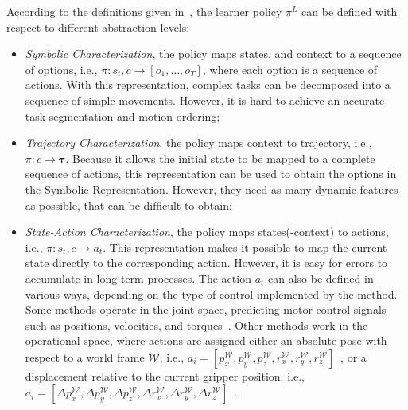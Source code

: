 According to the definitions given in~\cite{osa2018algorithmic,fang2019survey}, the learner policy $\pi^{L}$ can be defined with respect to different abstraction levels:
\begin{itemize}
    \item \textit{Symbolic Characterization}, the policy maps states, and context to a sequence of options, i.e., $\pi: s_{t}, c \rightarrow [o_1, \dots, o_T]$, where each option is a sequence of actions. With this representation, complex tasks can be decomposed into a sequence of simple movements. However, it is hard to achieve an accurate task segmentation and motion ordering;
    \item \textit{Trajectory Characterization}, the policy maps context to trajectory, i.e., $\pi: c \rightarrow \boldsymbol{\tau}$. Because it allows the initial state to be mapped to a complete sequence of actions, this representation can be used to obtain the options in the Symbolic Representation. However, they need as many dynamic features as possible, that can be difficult to obtain;
    \item \textit{State-Action Characterization}, the policy maps states(-context) to actions, i.e., $\pi: s_{t}, c \rightarrow a_{t}$. This representation makes it possible to map the current state directly to the corresponding action. However, it is easy for errors to accumulate in long-term processes. The action $a_{t}$ can also be defined in various ways, depending on the type of control implemented by the method. Some methods operate in the joint-space, predicting motor control signals such as positions, velocities, and torques~\cite{zhang2018deep_vr_teleoperation}. Other methods work in the operational space, where actions are assigned either an absolute pose with respect to a world frame $\mathcal{W}$, i.e., $a_{i} = \left[p_x^{\mathcal{W}}, p_y^{\mathcal{W}}, p_z^{\mathcal{W}}, r_x^{\mathcal{W}}, r_y^{\mathcal{W}}, r_z^{\mathcal{W}}\right]$~\cite{mandi2022towards_more_generalizable_one_shot}, or a displacement relative to the current gripper position, i.e., $a_{i} = \left[\Delta p_x^{\mathcal{W}}, \Delta p_y^{\mathcal{W}}, \Delta p_z^{\mathcal{W}}, \Delta r_x^{\mathcal{W}}, \Delta r_y^{\mathcal{W}}, \Delta r_z^{\mathcal{W}}\right]$~\cite{jang2022bc_z}.

\end{itemize}

